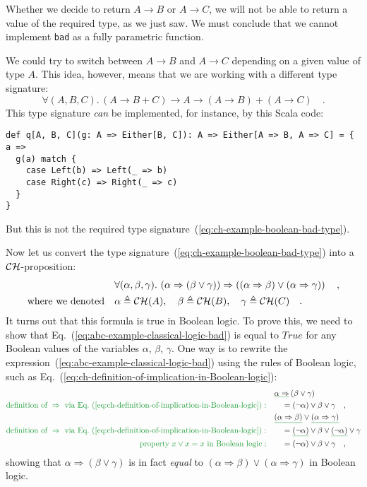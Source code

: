 Whether we decide to return $A\rightarrow B$ or $A\rightarrow C$,
we will not be able to return a value of the required type, as we
just saw. We must conclude that we cannot implement \lstinline!bad!
as a fully parametric function.

We could try to switch between $A\rightarrow B$ and $A\rightarrow C$
depending on a given value of type $A$. This idea, however, means
that we are working with a different type signature: 
\[
\forall(A,B,C).\,\left(A\rightarrow B+C\right)\rightarrow A\rightarrow\left(A\rightarrow B\right)+\left(A\rightarrow C\right)\quad.
\]
This type signature \emph{can} be implemented, for instance, by this
Scala code:
\begin{lstlisting}
def q[A, B, C](g: A => Either[B, C]): A => Either[A => B, A => C] = { a =>
  g(a) match {
    case Left(b) => Left(_ => b)
    case Right(c) => Right(_ => c)
  }
}
\end{lstlisting}
But this is not the required type signature~(\ref{eq:ch-example-boolean-bad-type}).

Now let us convert the type signature~(\ref{eq:ch-example-boolean-bad-type})
into a ${\cal CH}$-proposition:
\begin{align}
 & \forall(\alpha,\beta,\gamma).\,\left(\alpha\Rightarrow\left(\beta\vee\gamma\right)\right)\Rightarrow\left(\left(\alpha\Rightarrow\beta\right)\vee\left(\alpha\Rightarrow\gamma\right)\right)\quad,\label{eq:abc-example-classical-logic-bad}\\
\text{where we denoted}\quad & \alpha\triangleq{\cal CH}(A),\quad\beta\triangleq{\cal CH}(B),\quad\gamma\triangleq{\cal CH}(C)\quad.\nonumber 
\end{align}
It turns out that this formula is true in Boolean logic. To prove
this, we need to show that Eq.~(\ref{eq:abc-example-classical-logic-bad})
is equal to $True$ for any Boolean values of the variables $\alpha$,
$\beta$, $\gamma$. One way is to rewrite the expression~(\ref{eq:abc-example-classical-logic-bad})
using the rules of Boolean logic, such as Eq.~(\ref{eq:ch-definition-of-implication-in-Boolean-logic}):
\begin{align*}
 & \gunderline{\alpha\Rightarrow}\left(\beta\vee\gamma\right)\\
{\color{greenunder}\text{definition of }\Rightarrow\text{ via Eq.~(\ref{eq:ch-definition-of-implication-in-Boolean-logic})}:}\quad & \quad=(\neg\alpha)\vee\beta\vee\gamma\quad,\\
 & \gunderline{\left(\alpha\Rightarrow\beta\right)}\vee\gunderline{\left(\alpha\Rightarrow\gamma\right)}\\
{\color{greenunder}\text{definition of }\Rightarrow\text{ via Eq.~(\ref{eq:ch-definition-of-implication-in-Boolean-logic})}:}\quad & \quad=\gunderline{(\neg\alpha)}\vee\beta\vee\gunderline{(\neg\alpha)}\vee\gamma\\
{\color{greenunder}\text{property }x\vee x=x\text{ in Boolean logic}:}\quad & \quad=(\neg\alpha)\vee\beta\vee\gamma\quad,
\end{align*}
showing that $\alpha\Rightarrow(\beta\vee\gamma)$ is in fact \emph{equal}
to $\left(\alpha\Rightarrow\beta\right)\vee\left(\alpha\Rightarrow\gamma\right)$
in Boolean logic.

